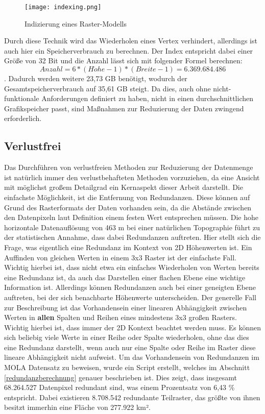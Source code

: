 \begin{figure}[H]
    \texttt{[image: indexing.png]}
    \caption{Indizierung eines Raster-Modells}
    \label{indexing}
\end{figure}

Durch diese Technik wird das Wiederholen eines Vertex verhindert, allerdings ist auch hier ein Speicherverbrauch zu berechnen. Der Index entspricht dabei einer Größe von 32 Bit und die Anzahl lässt sich mit folgender Formel berechnen: \[Anzahl = 6 * (H\ddot{o}he - 1) * (Breite - 1) = 6.369.684.486\]. Dadurch werden weitere 23,73 GB benötigt, wodurch der Gesamtspeicherverbrauch auf 35,61 GB steigt. Da dies, auch ohne nicht-funktionale Anforderungen definiert zu haben, nicht in einen durchschnittlichen Grafikspeicher passt, sind Maßnahmen zur Reduzierung der Daten zwingend erforderlich.

\subsection{Verlustfrei}
Das Durchführen von verlustfreien Methoden zur Reduzierung der Datenmenge ist natürlich immer den verlustbehafteten Methoden vorzuziehen, da eine Ansicht mit möglichst großem Detailgrad ein Kernaspekt dieser Arbeit darstellt. Die einfachste Möglichkeit, ist die Entfernung von Redundanzen. Diese können auf Grund des Rasterformats der Daten vorhanden sein, da die Abstände zwischen den Datenpixeln laut Definition einem festen Wert entsprechen müssen. Die hohe horizontale Datenauflösung von 463 m bei einer natürlichen Topographie führt zu der statistischen Annahme, dass dabei Redundanzen auftreten. Hier stellt sich die Frage, was eigentlich eine Redundanz im Kontext von 2D Höhenwerten ist. Ein Auffinden von gleichen Werten in einem 3x3 Raster ist der einfachste Fall. Wichtig hierbei ist, dass nicht etwa ein einfaches Wiederholen von Werten bereits eine Redundanz ist, da auch das Darstellen einer flachen Ebene eine wichtige Information ist. Allerdings können Redundanzen auch bei einer geneigten Ebene auftreten, bei der sich benachbarte Höhenwerte unterscheiden. Der generelle Fall zur Beschreibung ist das Vorhandensein einer linearen Abhängigkeit zwischen Werten in \textbf{allen} Spalten und Reihen eines mindestens 3x3 großen Rasters\cite{topoDataReduction}. Wichtig hierbei ist, dass immer der 2D Kontext beachtet werden muss. Es können sich beliebig viele Werte in einer Reihe oder Spalte wiederholen, ohne das dies eine Redundanz darstellt, wenn auch nur eine Spalte oder Reihe im Raster diese lineare Abhängigkeit nicht aufweist. Um das Vorhandensein von Redundanzen im MOLA Datensatz zu beweisen, wurde ein Script erstellt, welches im Abschnitt \ref{redundanzberechnung} genauer beschrieben ist. Dies zeigt, dass insgesamt 68.264.527 Datenpixel redundant sind, was einem Prozentsatz von 6,43 \% entspricht. Dabei existieren 8.708.542 redundante Teilraster, das größte von ihnen besitzt immerhin eine Fläche von 277.922 km².

